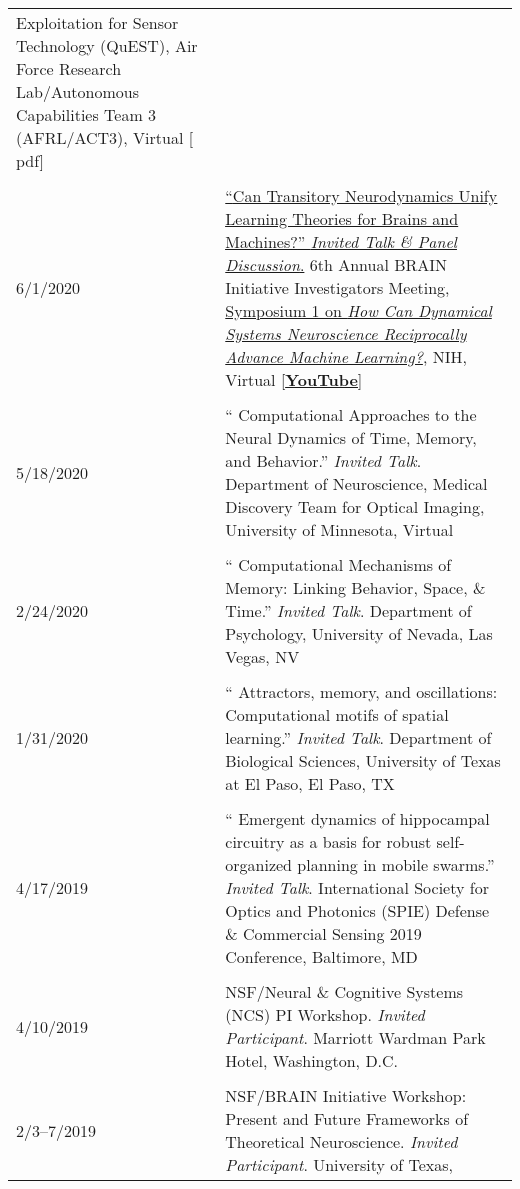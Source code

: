 \documentclass[10pt]{article}
\newcommand{\itemtitle}[1]{{\color{hopkinsblue}\ul{#1}}}
\newcommand{\unpubtitle}[1]{{\color{hopkinsblue} #1}}
\begin{document}
\begin{longtable}{@{\hspace{0.2in}}l>{\raggedright\arraybackslash}p{}}
{  Exploitation for Sensor Technology (QuEST), Air Force Research Lab/Autonomous
  Capabilities Team 3 (AFRL/ACT3), Virtual [\unpubtitle{pdf}]}\\
  \tabularnewline
  6/1/2020
  \hspace{0.3in} &
  \href{https://youtu.be/2jy1ENYHRAw?t=902}
  {``\itemtitle{Can Transitory Neurodynamics Unify Learning Theories for Brains
  and Machines?}'' \emph{Invited Talk \& Panel Discussion}.}
  6th Annual BRAIN Initiative Investigators Meeting,
  \href{https://www.labroots.com/webinar/symposium-1-dynamical-systems-neuroscience-reciprocally-advance-machine-learning}
  {Symposium 1 on \unpubtitle{\emph{How Can Dynamical Systems Neuroscience
  Reciprocally Advance Machine Learning?}}}, NIH, Virtual 
  [\href{https://youtu.be/2jy1ENYHRAw?t=902}{{\itemtitle{\bf YouTube}}}] \\
  \tabularnewline
  5/18/2020 \hspace{0.3in} & ``\unpubtitle{Computational Approaches to the
  Neural Dynamics of Time, Memory, and Behavior}.'' \emph{Invited Talk}.
  Department of Neuroscience, Medical Discovery Team for Optical Imaging,
  University of Minnesota, Virtual \\
  \tabularnewline
  2/24/2020 \hspace{0.3in} & ``\unpubtitle{Computational Mechanisms of Memory:
  Linking Behavior, Space, \& Time}.'' \emph{Invited Talk}. Department of
  Psychology, University of Nevada, Las Vegas, NV \\
  \tabularnewline
  1/31/2020 \hspace{0.3in} & ``\unpubtitle{Attractors, memory, and oscillations:
  Computational motifs of spatial learning}.'' \emph{Invited Talk}.
  Department of Biological Sciences, University of Texas at El Paso, El Paso, TX \\
  \tabularnewline
  4/17/2019 \hspace{0.3in} & ``\unpubtitle{Emergent dynamics of hippocampal
  circuitry as a basis for robust self-organized planning in mobile swarms}.''
  \emph{Invited Talk}. International Society for Optics and Photonics (SPIE)
  Defense \& Commercial Sensing 2019 Conference, Baltimore, MD \\
  \tabularnewline
  4/10/2019 & NSF/Neural \& Cognitive Systems (NCS) PI
  Workshop. \emph{Invited Participant}. Marriott Wardman Park Hotel, Washington, D.C. \\
  \tabularnewline
  2/3--7/2019 & NSF/BRAIN Initiative Workshop: Present and Future Frameworks
  of Theoretical Neuroscience. \emph{Invited Participant}. University of Texas,

\end{longtable}
\end{document}

